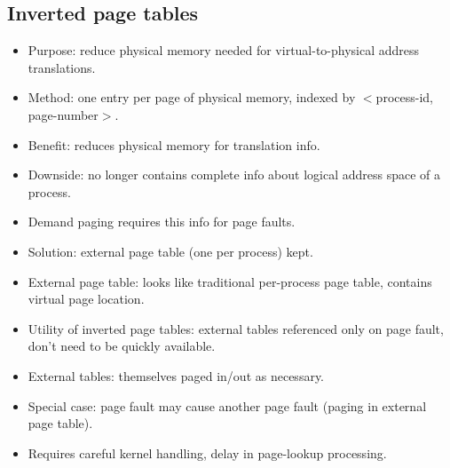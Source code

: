 \subsection{Inverted page tables}
\begin{itemize}
    \item Purpose: reduce physical memory needed for virtual-to-physical address translations.
    \item Method: one entry per page of physical memory, indexed by $<$process-id, page-number$>$.
    \item Benefit: reduces physical memory for translation info.
    \item Downside: no longer contains complete info about logical address space of a process.
    \item Demand paging requires this info for page faults.
    \item Solution: external page table (one per process) kept.
    \item External page table: looks like traditional per-process page table, contains virtual page location.
    \item Utility of inverted page tables: external tables referenced only on page fault, don't need to be quickly available.
    \item External tables: themselves paged in/out as necessary.
    \item Special case: page fault may cause another page fault (paging in external page table).
    \item Requires careful kernel handling, delay in page-lookup processing.
\end{itemize}

